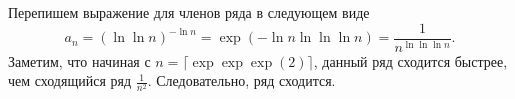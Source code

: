 \documentclass{article}
\begin{document}
Перепишем выражение для членов ряда в следующем виде
$$a_n = (\ln \ln n)^{-\ln n} = \exp (-\ln n \ln \ln \ln n) = \frac{1}{n^{\ln \ln \ln n}}.$$
Заметим, что начиная с $n = \lceil \exp \exp \exp (2) \rceil$, данный ряд сходится быстрее, чем 
сходящийся ряд $\frac{1}{n^2}$. Следовательно, ряд сходится.
\end{document}
